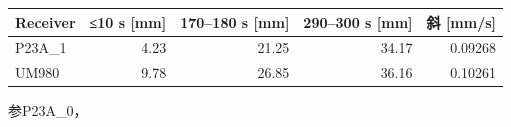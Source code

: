 \documentclass[11pt,a4paper]{article}
\numberwithin{equation}{section}
\numberwithin{figure}{section}
\begin{document}
\begin{center}\begin{lrbox}{\reporttable}\small\setlength{\tabcolsep}{4pt}\begin{tabular}{lrrrr}\toprule
Receiver & ≤10 s [mm] & 170–180 s [mm] & 290–300 s [mm] & {\cjkfont 斜}\allowbreak{}{\cjkfont 率}\allowbreak{} [mm/\allowbreak{}s]\\\midrule
P23A\_1 & 4.23 & 21.25 & 34.17 & 0.09268\\
UM980 & 9.78 & 26.85 & 36.16 & 0.10261\\
\bottomrule\end{tabular}\end{lrbox}\ifdim\wd\reporttable>\linewidth\resizebox{\linewidth}{!}{\usebox{\reporttable}}\else\usebox{\reporttable}\fi\end{center}

{\cjkfont 参}\allowbreak{}P23A\_0{\cjkfont ，}\allowbreak{}
\end{document}
